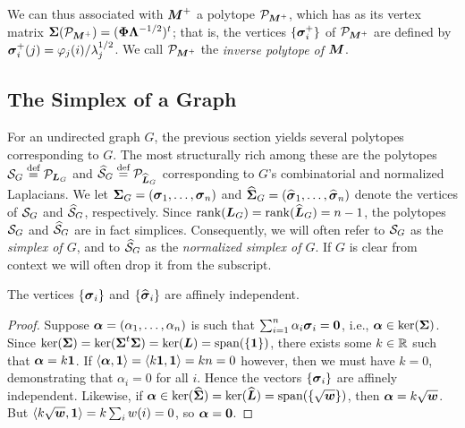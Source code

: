 We can thus associated with ${\vb*{M}}^+$ a polytope $\mathcal{P}_{{\vb*{M}}^+}$, which has as its vertex matrix $\boldsymbol{\Sigma}(\mathcal{P}_{{\vb*{M}}^+})=(\boldsymbol{\Phi}\vb{\Lambda}^{-1/2})^t$; that is, the vertices $\{\vb*{\sigma}_i^+\}$ of $\mathcal{P}_{{\vb*{M}}^+}$ are defined by 
$\vb*{\sigma}_i^+(j)=\varphi_j(i)/\lambda_j^{1/2}$. We call $\mathcal{P}_{{\vb*{M}}^+}$ the \emph{inverse polytope of ${\vb*{M}}$}. 

\subsection{The Simplex of a Graph}
\label{sec:graph_to_simplex}
For an undirected graph $G$, the previous section yields several polytopes corresponding to $G$. The most structurally rich among these are the polytopes $\mathcal{S}_G\overset{\text{def}}{=} \mathcal{P}_{\vb*{L}_G}$ and $\widehat{\mathcal{S}}_G\overset{\text{def}}{=} \mathcal{P}_{\widehat{\vb*{L}}_G}$ corresponding to $G$'s combinatorial and normalized Laplacians.  We let $\boldsymbol{\Sigma}_G=(\vb*{\sigma}_1,\dots,\vb*{\sigma}_n)$ and $\widehat{\boldsymbol{\Sigma}}_G=(\widehat{\vb*{\sigma}}_1,\dots,\widehat{\vb*{\sigma}}_n)$ denote the vertices of $\mathcal{S}_G$ and $\widehat{\mathcal{S}}_G$, respectively. Since $\rank(\vb*{L}_G)=\rank(\widehat{\vb*{L}}_G)=n-1$, the polytopes $\mathcal{S}_G$ and $\widehat{\mathcal{S}}_G$ are in fact simplices. Consequently, we will often refer to $\mathcal{S}_G$ as the \emph{simplex of $G$}, and to $\widehat{\mathcal{S}}_G$ as the \emph{normalized simplex of $G$}. If $G$ is clear from context we will often drop it from the subscript. 

\begin{lemma}
\label{lem:sv_affine_indep}
The vertices $\{\vb*{\sigma}_i\}$  and $\{\widehat{\vb*{\sigma}}_i\}$ are affinely independent. 
\end{lemma}
\begin{proof}
Suppose $\vb*{\alpha} = (\alpha_1,\dots,\alpha_n)$ is such that 
$\sum_{i=1}^n \alpha_i\vb*{\sigma}_i = \vb{0}$, i.e., $\vb*{\alpha}\in\ker(\boldsymbol{\Sigma})$. Since $\ker(\boldsymbol{\Sigma})=\ker(\boldsymbol{\Sigma}^t\boldsymbol{\Sigma})=\ker(\vb*{L})=\textnormal{span}(\{\vb{1}\})$, there exists some $k\in \mathbb{R}$ such that $\vb*{\alpha}=k\vb{1}$. If $\langle \vb*{\alpha},\vb{1}\rangle = \langle k\vb{1},\vb{1}\rangle=kn=0$ however, then we must have $k=0$, demonstrating that $\alpha_i=0$ for all $i$. Hence the vectors $\{\vb*{\sigma}_i\}$ are affinely independent. Likewise, if $\vb*{\alpha}\in\ker(\widehat{\boldsymbol{\Sigma}})=\ker(\widehat{\vb*{L}})=\textnormal{span}(\{\sqrt{\vb*{w}}\})$, then $\vb*{\alpha}=k\sqrt{\vb*{w}}$. But $\langle k\sqrt{\vb*{w}},\vb{1}\rangle = k\sum_{i}w(i)=0$, so $\vb*{\alpha}=\vb{0}$. 
\end{proof}

